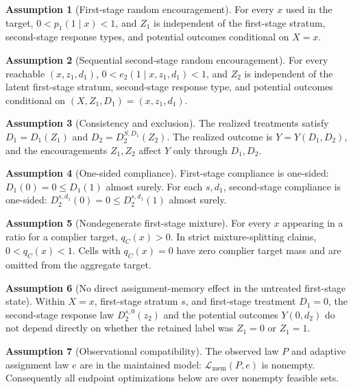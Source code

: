 \documentclass[11pt]{article}
\theoremstyle{definition}
\newtheorem{assumption}{Assumption}
\theoremstyle{plain}
\theoremstyle{remark}
\begin{document}
\begin{assumption}[First-stage random encouragement]\label{ass:first-rand}
For every \(x\) used in the target, \(0<p_1(1\mid x)<1\), and \(Z_1\) is independent of the first-stage stratum, second-stage response types, and potential outcomes conditional on \(X=x\).
\end{assumption}

\begin{assumption}[Sequential second-stage random encouragement]\label{ass:second-rand}
For every reachable \((x,z_1,d_1)\), \(0<e_2(1\mid x,z_1,d_1)<1\), and \(Z_2\) is independent of the latent first-stage stratum, second-stage response type, and potential outcomes conditional on \((X,Z_1,D_1)=(x,z_1,d_1)\).
\end{assumption}

\begin{assumption}[Consistency and exclusion]\label{ass:consistency}
The realized treatments satisfy \(D_1=D_1(Z_1)\) and \(D_2=D_2^{S,D_1}(Z_2)\).  The realized outcome is \(Y=Y(D_1,D_2)\), and the encouragements \(Z_1,Z_2\) affect \(Y\) only through \(D_1,D_2\).
\end{assumption}

\begin{assumption}[One-sided compliance]\label{ass:one-sided}
First-stage compliance is one-sided: \(D_1(0)=0\le D_1(1)\) almost surely.  For each \(s,d_1\), second-stage compliance is one-sided: \(D_2^{s,d_1}(0)=0\le D_2^{s,d_1}(1)\) almost surely.
\end{assumption}

\begin{assumption}[Nondegenerate first-stage mixture]\label{ass:nondegenerate}
For every \(x\) appearing in a ratio for a complier target, \(q_C(x)>0\).  In strict mixture-splitting claims, \(0<q_C(x)<1\).  Cells with \(q_C(x)=0\) have zero complier target mass and are omitted from the aggregate target.
\end{assumption}

\begin{assumption}[No direct assignment-memory effect in the untreated first-stage state]\label{ass:no-memory-direct}
Within \(X=x\), first-stage stratum \(s\), and first-stage treatment \(D_1=0\), the second-stage response law \(D_2^{s,0}(z_2)\) and the potential outcomes \(Y(0,d_2)\) do not depend directly on whether the retained label was \(Z_1=0\) or \(Z_1=1\).
\end{assumption}

\begin{assumption}[Observational compatibility]\label{ass:compatible}
The observed law \(P\) and adaptive assignment law \(e\) are in the maintained model: \(\mathcal L_{\mathrm{mem}}(P,e)\) is nonempty.  Consequently all endpoint optimizations below are over nonempty feasible sets.
\end{assumption}
\end{document}
